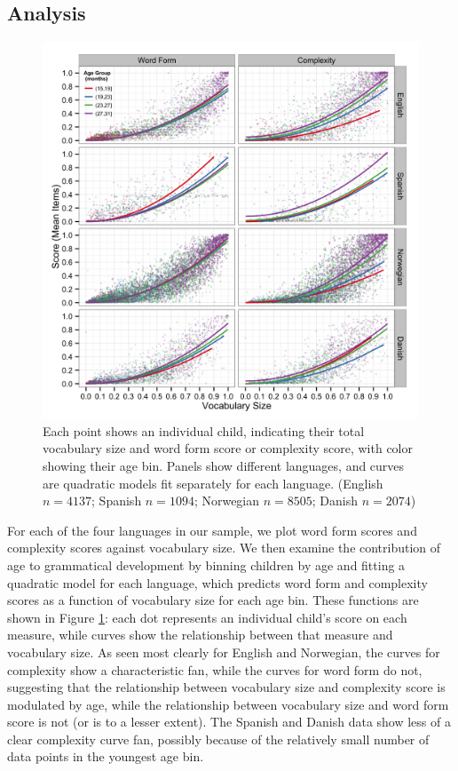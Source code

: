\documentclass[10pt,letterpaper]{article}
\begin{document}
\subsection{Analysis}

\begin{figure}[tbh!]
\begin{center}
\includegraphics[width=\textwidth]{plots/grammar.png}
\end{center}
\caption{\label{fig:grammar} Each point shows an individual child, indicating their total vocabulary size and word form score or complexity score, with color showing their age bin. Panels show different languages, and curves are quadratic models fit separately for each language. (English $n=4137$; Spanish $n=1094$; Norwegian $n=8505$; Danish $n=2074$)} 
\end{figure}

For each of the four languages in our sample, we plot word form scores and complexity scores against vocabulary size. We then examine the contribution of age to grammatical development by binning children by age and fitting a quadratic model for each language, which predicts word form and complexity scores as a function of vocabulary size for each age bin. These functions are shown in Figure \ref{fig:grammar}: each dot represents an individual child's score on each measure, while curves show the relationship between that measure and vocabulary size. As seen most clearly for English and Norwegian, the curves for complexity show a characteristic fan, while the curves for word form do not, suggesting that the relationship between vocabulary size and complexity score is modulated by age, while the relationship between vocabulary size and word form score is not (or is to a lesser extent). The Spanish and Danish data show less of a clear complexity curve fan, possibly because of the relatively small number of data points in the youngest age bin.
\end{document}
